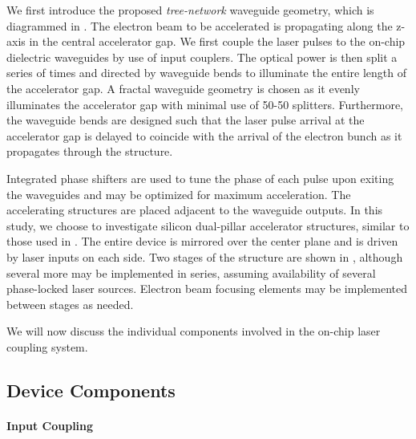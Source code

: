
We first introduce the proposed \textit{tree-network} waveguide geometry, which is diagrammed in .
The electron beam to be accelerated is propagating along the z-axis in the central accelerator gap.
We first couple the laser pulses to the on-chip dielectric waveguides by use of input couplers.
The optical power is then split a series of times and directed by waveguide bends to illuminate the entire length of the accelerator gap.
A fractal waveguide geometry is chosen as it evenly illuminates the accelerator gap with minimal use of 50-50 splitters.
Furthermore, the waveguide bends are designed such that the laser pulse arrival at the accelerator gap is delayed to coincide with the arrival of the electron bunch as it propagates through the structure.

Integrated phase shifters are used to tune the phase of each pulse upon exiting the waveguides and may be optimized for maximum acceleration.
The accelerating structures are placed adjacent to the waveguide outputs.
In this study, we choose to investigate silicon dual-pillar accelerator structures, similar to those used in \cite{leedle2015dielectric}.
The entire device is mirrored over the center plane and is driven by laser inputs on each side.
Two stages of the structure are shown in , although several more may be implemented in series, assuming availability of several phase-locked laser sources.
Electron beam focusing elements may be implemented between stages as needed.

We will now discuss the individual components involved in the on-chip laser coupling system.

\subsection{Device Components}

\paragraph{Input Coupling}

